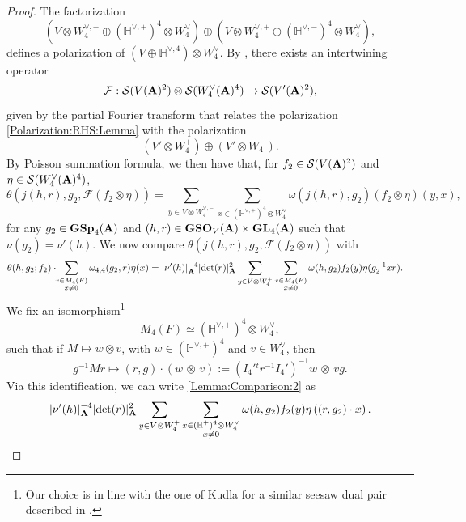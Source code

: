 \documentclass[11pt, reqno]{amsart}
\theoremstyle{plain}
\theoremstyle{definition}
\theoremstyle{remark}
\theoremstyle{plain}
\def\A{{\bf A}}
\def\GSp{{\mathbf{GSp}}}
\def\GSO{{\mathbf{GSO}}}
\def\GL{\mathbf{GL}}
\begin{document}
\begin{proof}
     The factorization \begin{equation}\label{Polarization:RHS:Lemma}\left(V\otimes W_4^{\vee,-}\oplus  (\mathbb{H}^{\vee,+})^4 \otimes W_4^\vee \right)\oplus\left(V\otimes W_4^{\vee,+} \oplus (\mathbb{H}^{\vee,-})^4 \otimes W_4^\vee\right),\end{equation}
    defines a polarization of $(V\oplus \mathbb{H}^{\vee,4})\otimes W_4^\vee$. By \cite[Chapitre 2, I.7]{Moeglin:Vigneras:Waldspurger}, there exists an intertwining operator \[\mathcal{F}: \mathcal{S}(V(\A)^2)\otimes \mathcal{S}(W_4^\vee(\A)^4)\to \mathcal{S}(V'(\A)^2),\]
    given by the partial Fourier transform that relates the polarization \eqref{Polarization:RHS:Lemma} with the polarization $$\left(V'\otimes W_4^+\right)\oplus\left(V' \otimes W_4^-\right).$$ By Poisson summation formula, we then have that, for $f_2 \in \mathcal{S}(V(\A)^2)$ and $\eta \in \mathcal{S}(W_4^\vee(\A)^4)$,    \begin{equation}\label{Mixed:Model:Lemma:Comparison}\theta(j(h,r), g_2, \mathcal{F}(f_2\otimes \eta)) = \sum_{y\in V\otimes W_4^{\vee,-}}\sum_{x\in (\mathbb{H}^{\vee,+})^4 \otimes W_4^\vee}\omega(j(h,r),g_2) (f_2 \otimes \eta)(y,x),\end{equation}
    for any $g_2 \in \GSp_4(\A)$ and $(h,r) \in \GSO_V(\A) \times \GL_4(\A)$ such that $\nu(g_2) = \nu'(h)$. We now compare $\theta(j(h,r), g_2, \mathcal{F}(f_2\otimes \eta)) $ with
    \begin{align}\theta(h,g_2;f_2)\cdot \!\!\sum_{\substack{x\in M_4(F)\\x\neq 0}}\omega_{4,4}(g_2,r)\eta(x)  &= | \nu'(h)|_\A^{-4} |{\rm det}(r)|_\A^2\sum_{y\in V\otimes W_4^+}  \sum_{\substack{x\in M_4(F)\\x\neq 0}}  \omega(h,g_2) f_2(y)  \eta(g_2^{-1}xr).  \label{Lemma:Comparison:2} 
    \end{align} 
 We fix an isomorphism\footnote{Our choice is in line with the one of Kudla for a similar seesaw dual pair described in \cite[(2.22) \& (2.23)]{SeeSawKudla}.} $$M_{4}(F) \simeq  (\mathbb{H}^{\vee,+})^4 \otimes W_4^\vee,$$  such that if $M \mapsto w \otimes v$, with $w \in (\mathbb{H}^{\vee,+})^4$ and $v \in W_4^\vee$, then $$g^{-1} M r \mapsto (r,g) \cdot  (w \, \otimes \, v)  :=(I_4'{}^tr^{-1}I_4')^{-1}  w \, \otimes \, v  g .$$    
Via this identification, we can write \eqref{Lemma:Comparison:2} as 
\[ | \nu'(h)|_\A^{-4} |{\rm det}(r)|_\A^2\sum_{y\in V\otimes W_4^+}  \sum_{\substack{x\in (\mathbb{H}^{+})^4 \otimes W_4^\vee \\x\neq 0}}  \omega(h,g_2) f_2(y) \eta\left((r,g_2)\cdot   x\right). \] 

\end{proof}
\end{document}
